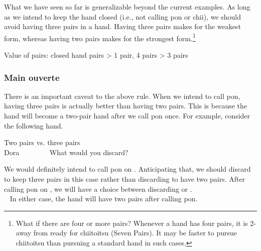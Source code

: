 \bigskip
What we have seen so far is generalizable beyond the current examples. As long as we intend to keep the hand closed (i.e., not calling {\jap pon} or {\jap chii}), we should avoid having three pairs in a hand. Having three pairs makes for the weakest form, whereas having two pairs makes for the strongest form.\footnote{What if there are four or more pairs? Whenever a hand has four pairs, it is 2-away from ready for {\jap chiitoitsu} (Seven Pairs). It may be faster to pursue {\jap chiitoitsu} than pursuing a standard hand in such cases.}

\bigskip

\color{MyRed}
\begin{itembox}[c]{Value of pairs: closed hand}
\centering{} pairs > 1 pair, 4 pairs > 3 pairs
\end{itembox}\normalcolor

\bigskip

\subsubsection{Main ouverte}

There is an important caveat to the above rule. 
When we intend to call {\jap pon}, having three pairs is actually better than having two pairs. This is because the hand will become a two-pair hand after we call {\jap pon} once.
For example, consider the following hand. 
\begin{itembox}[r]{Two pairs vs. three pairs}
\bp
{}\zhong\zhong~\zhong\\
\hfill\footnotesize{{\jap Dora}~~~~~~~~}
\ep
\vspace{-17pt}What would you discard? \vspace{-5pt}
\end{itembox}
\noindent
We would definitely intend to call {\jap pon} on {\LARGE\zhong}. Anticipating that, we should discard {\LARGE{}} to keep three pairs in this case rather than discarding {\LARGE{}} to have two pairs. After calling {\jap pon} on {\LARGE\zhong}, we will have a choice between discarding  {\LARGE{}} or {\LARGE{}}.
\bp
{}~\zhong\rzhong\zhong\\
~\zhong\rzhong\zhong
\ep
In either case, the hand will have two pairs after calling {\jap pon}. 


